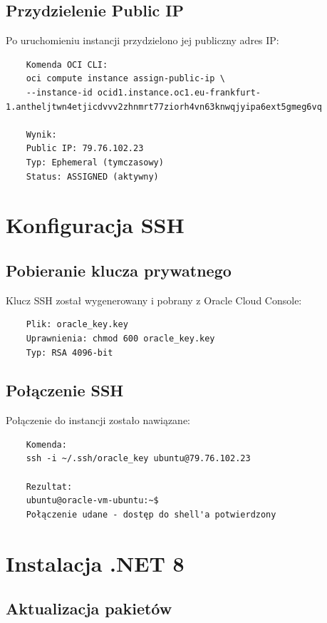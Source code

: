 \documentclass[twoside]{article}
\begin{document}
\subsection{Przydzielenie Public IP}

Po uruchomieniu instancji przydzielono jej publiczny adres IP:

\begin{verbatim}
	Komenda OCI CLI:
	oci compute instance assign-public-ip \
	--instance-id ocid1.instance.oc1.eu-frankfurt-1.antheljtwn4etjicdvvv2zhnmrt77ziorh4vn63knwqjyipa6ext5gmeg6vq
	
	Wynik:
	Public IP: 79.76.102.23
	Typ: Ephemeral (tymczasowy)
	Status: ASSIGNED (aktywny)
\end{verbatim}

\section{Konfiguracja SSH}

\subsection{Pobieranie klucza prywatnego}

Klucz SSH został wygenerowany i pobrany z Oracle Cloud Console:

\begin{verbatim}
	Plik: oracle_key.key
	Uprawnienia: chmod 600 oracle_key.key
	Typ: RSA 4096-bit
\end{verbatim}

\subsection{Połączenie SSH}

Połączenie do instancji zostało nawiązane:

\begin{verbatim}
	Komenda:
	ssh -i ~/.ssh/oracle_key ubuntu@79.76.102.23
	
	Rezultat:
	ubuntu@oracle-vm-ubuntu:~$
	Połączenie udane - dostęp do shell'a potwierdzony
\end{verbatim}

\section{Instalacja .NET 8}

\subsection{Aktualizacja pakietów}
\end{document}
